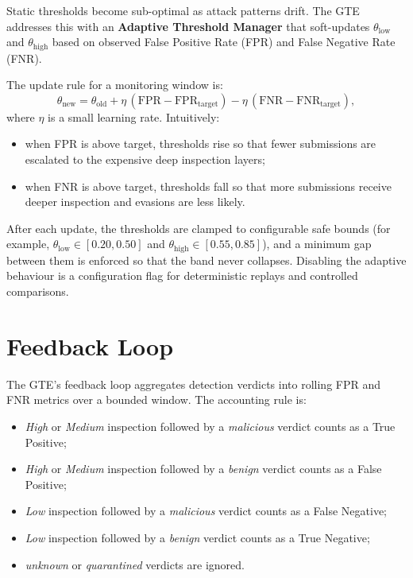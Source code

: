 \documentclass[12pt, a4paper]{report}
\begin{document}
Static thresholds become sub-optimal as attack patterns drift. The GTE
addresses this with an \textbf{Adaptive Threshold Manager} that
soft-updates $\theta_{\text{low}}$ and $\theta_{\text{high}}$ based on
observed False Positive Rate (FPR) and False Negative Rate (FNR).

The update rule for a monitoring window is:
\[
\theta_{\text{new}} = \theta_{\text{old}} + \eta \, (\mathrm{FPR} - \mathrm{FPR}_{\text{target}})
- \eta \, (\mathrm{FNR} - \mathrm{FNR}_{\text{target}}),
\]
where $\eta$ is a small learning rate. Intuitively:
\begin{itemize}
    \item when FPR is above target, thresholds rise so that fewer
          submissions are escalated to the expensive deep inspection
          layers;
    \item when FNR is above target, thresholds fall so that more
          submissions receive deeper inspection and evasions are less
          likely.
\end{itemize}

After each update, the thresholds are clamped to configurable safe
bounds (for example,
$\theta_{\text{low}} \in [0.20, 0.50]$ and
$\theta_{\text{high}} \in [0.55, 0.85]$), and a minimum gap between
them is enforced so that the band never collapses. Disabling the
adaptive behaviour is a configuration flag for deterministic replays
and controlled comparisons.

\section{Feedback Loop}

The GTE's feedback loop aggregates detection verdicts into rolling
FPR and FNR metrics over a bounded window. The accounting rule is:
\begin{itemize}
    \item \emph{High} or \emph{Medium} inspection followed by a
          \emph{malicious} verdict counts as a True Positive;
    \item \emph{High} or \emph{Medium} inspection followed by a
          \emph{benign} verdict counts as a False Positive;
    \item \emph{Low} inspection followed by a \emph{malicious} verdict
          counts as a False Negative;
    \item \emph{Low} inspection followed by a \emph{benign} verdict
          counts as a True Negative;
    \item \emph{unknown} or \emph{quarantined} verdicts are ignored.
\end{itemize}
\end{document}

